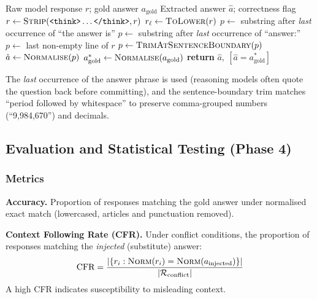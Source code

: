 \begin{algorithm}[!ht]
\caption{Answer Extraction and Normalisation}
\label{alg:extract}
\begin{algorithmic}[1]
\Require Raw model response $r$; gold answer $a_{\text{gold}}$
\Ensure Extracted answer $\hat{a}$; correctness flag
\State $r \gets \textsc{Strip}(\texttt{<think>}\ldots\texttt{</think>}, r)$ 
\State $r_{\ell} \gets \textsc{ToLower}(r)$
    \State $p \gets$ substring after \emph{last} occurrence of ``the answer is''
    \State $p \gets$ substring after \emph{last} occurrence of ``answer:''
\Else
    \State $p \gets$ last non-empty line of $r$ 
\EndIf
\State $p \gets \textsc{TrimAtSentenceBoundary}(p)$ 
\State $\hat{a} \gets \textsc{Normalise}(p)$ 
\State $a^*_{\text{gold}} \gets \textsc{Normalise}(a_{\text{gold}})$
\State \textbf{return} $\hat{a},\ [\hat{a} = a^*_{\text{gold}}]$
\end{algorithmic}
\end{algorithm}

The \emph{last} occurrence of the answer phrase is used (reasoning models often quote the question back before committing), and the sentence-boundary trim matches ``period followed by whitespace'' to preserve comma-grouped numbers (``9,984,670'') and decimals.

\subsection{Evaluation and Statistical Testing (Phase 4)}
\label{sec:evaluation}

\subsubsection{Metrics}

\textbf{Accuracy.} Proportion of responses matching the gold answer under normalised exact match (lowercased, articles and punctuation removed).

\textbf{Context Following Rate (CFR).} Under conflict conditions, the proportion of responses matching the \emph{injected} (substitute) answer:
\begin{equation}
    \text{CFR} = \frac{|\{r_i : \textsc{Norm}(r_i) = \textsc{Norm}(a_{\text{injected}})\}|}{|\mathcal{R}_{\text{conflict}}|}
\end{equation}
A high CFR indicates susceptibility to misleading context.


